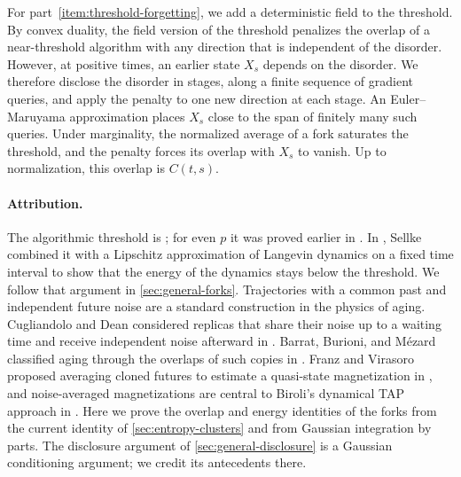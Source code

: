 For part~\ref{item:threshold-forgetting}, we add a deterministic field to
the threshold. By convex duality, the field version of the threshold
penalizes the overlap of a near-threshold algorithm with any direction
that is independent of the disorder. However, at positive times, an earlier state $X_s$ depends on the disorder. We therefore disclose the disorder in stages,
along a finite sequence of gradient queries, and apply the penalty to one
new direction at each stage. An Euler--Maruyama approximation places $X_s$
close to the span
of finitely many such queries. Under marginality, the normalized average of
a fork saturates the threshold, and the penalty forces its overlap with
$X_s$ to vanish. Up to normalization, this overlap is $C(t,s)$.

\paragraph{Attribution.}
The algorithmic threshold is \cite[Theorem~1 and Corollary~1.8]{hs2023};
for even $p$ it was proved earlier in \cite{hs2021}. In
\cite[Section~3]{sellke2024}, Sellke combined it with a Lipschitz
approximation of Langevin dynamics on a fixed time interval to show that
the energy of the dynamics stays below the threshold. We follow that
argument in \cref{sec:general-forks}. Trajectories with a common past and
independent future noise are a standard construction in the physics of
aging. Cugliandolo and Dean considered replicas that share their noise up
to a waiting time and receive independent noise afterward in
\cite[arXiv version~1, Section~II]{cugliandolodean1995}. Barrat, Burioni, and M\'ezard classified aging through the overlaps of such copies in
\cite[Sections~2 and~4]{bbm1996}. Franz and Virasoro
proposed averaging cloned futures to estimate a quasi-state magnetization in
\cite[arXiv version~3, Section~III]{franzvirasoro2000}, and noise-averaged
magnetizations are central to Biroli's dynamical TAP approach in
\cite[arXiv version~2, Section~III.B]{biroli1999}. Here we prove the overlap and energy identities of the forks from the
current identity of \cref{sec:entropy-clusters} and from Gaussian
integration by parts. The
disclosure argument of \cref{sec:general-disclosure} is a Gaussian
conditioning argument; we credit its antecedents there.

